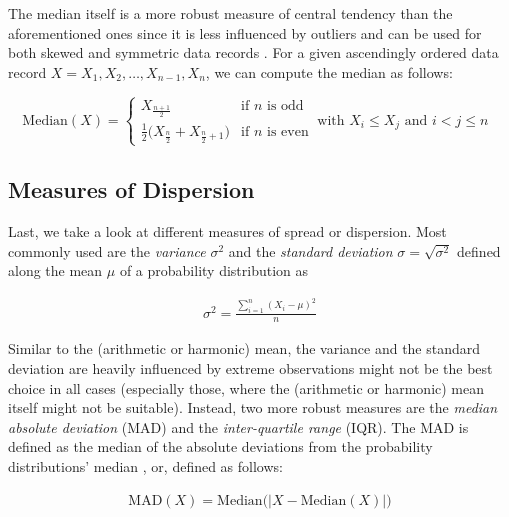 The median itself is a more robust measure of central tendency than the
aforementioned ones since it is less influenced by outliers and can be used for
both skewed and symmetric data records \citep{shanmugam_statistics_2015}. For a
given ascendingly ordered data record $X = X_1, X_2, \ldots, X_{n-1}, X_n$, we
can compute the median as follows:

\begin{equation} \label{eq:median}
\mathrm{Median}(X) = \begin{cases}
     X_{\frac{n+1}{2}} & \text{if $n$ is odd} \\
     \frac{1}{2}\big(X_{\frac{n}{2}} + X_{\frac{n}{2}+1}\big) & \text{if $n$ is
     even}
   \end{cases}~\text{with $X_i \leq X_j$ and $i < j \leq n$ }
\end{equation}

\subsection{Measures of Dispersion}

Last, we take a look at different measures of spread or dispersion. Most
commonly used are the \emph{variance} $\sigma^2$ and the \emph{standard
deviation} $\sigma = \sqrt{\sigma^2}$ defined along the mean $\mu$ of a
probability distribution as

\begin{equation} \label{eq:variance}
\begin{split}
\sigma^2 = \frac{\sum_{i=1}^{n}(X_i - \mu)^2}{n}
\end{split}
\end{equation}

Similar to the (arithmetic or harmonic) mean, the variance and the standard
deviation are heavily influenced by extreme observations \citep{shanmugam_statistics_2015} might not
be the best choice in all cases (especially those, where the (arithmetic or harmonic) mean itself might not be
suitable). Instead, two more robust measures are the \emph{median absolute
deviation} (MAD) and the \emph{inter-quartile range} (IQR). The MAD is defined
as the median of the absolute deviations from the probability distributions'
median \citep{molyneaux_art_2014}, or, defined as follows:

\begin{equation} \label{eq:mad}
\begin{split}
\mathrm{MAD}(X) = \mathrm{Median}\big(|X - \mathrm{Median}(X)|\big)
\end{split}
\end{equation}
 
